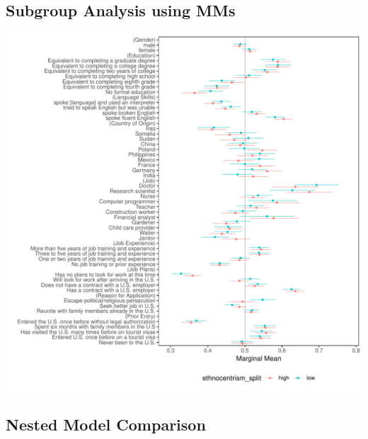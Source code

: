 \documentclass[a4paper,12pt]{article}\usepackage[]{graphicx}\usepackage[]{color}
\makeatletter
\def\maxwidth{ %
  \ifdim\Gin@nat@width>\linewidth
    \linewidth
  \else
    \Gin@nat@width
  \fi
}
\newenvironment{knitrout}{}{} %
\makeatother
\begin{document}
\clearpage

\subsection{Subgroup Analysis using MMs}

\begin{knitrout}
\color{fgcolor}
\includegraphics[width=\maxwidth]{figure/hainmueller_immigration_subgroup_mm_appendix-1} 

\end{knitrout}

\clearpage

\subsection{Nested Model Comparison}
\end{document}
